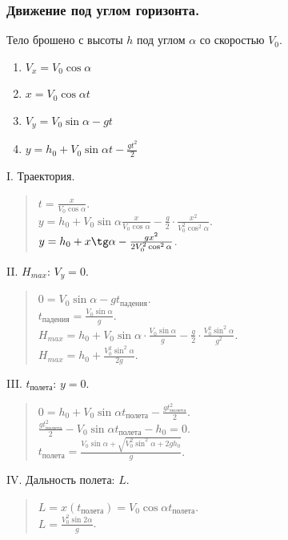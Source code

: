 \documentclass{article}
\begin{document}
	\subsubsection{Движение под углом горизонта.}
	Тело брошено с высоты $h$ под углом $\alpha$ со скоростью $V_0$. \\
	\begin{enumerate}
		\item $V_x = V_0 \cos\alpha$
		\item $x = V_0 \cos\alpha t$
		\item $V_y = V_0 \sin\alpha - gt$
		\item $y = h_0 + V_0 \sin\alpha t - \frac{gt^2}{2}$
	\end{enumerate}
	I. Траектория. \\
	\begin{quote}
		$t = \frac{x}{V_0 \cos\alpha}$. \\
		$y = h_0 + V_0 \sin\alpha \frac{x}{V_0 \cos\alpha} - \frac{g}{2} \cdot \frac{x^2}{V_0^2 \cos^2\alpha}$. \\
		$y = h_0 + x \tg\alpha - \frac{gx^2}{2V_0^2\cos^2\alpha}$. \\
	\end{quote}
	II. $H_{max}$: $V_{y} = 0$. \\
	\begin{quote}
		$0 = V_0 \sin\alpha - gt_{\text{падения}}$. \\
		$t_{\text{падения}} = \frac{V_0 \sin\alpha}{g}$. \\
		$H_{max} = h_0 + V_0 \sin\alpha \cdot \frac{V_0 \sin\alpha}{g} - \frac{g}{2} \cdot \frac{V_0^2 \sin^2\alpha}{g^2}$. \\
		$H_{max} = h_0 + \frac{V_0^2 \sin^2\alpha}{2g}$. \\
	\end{quote}
	III. $t_{\text{полета}}$: $y = 0$. \\
	\begin{quote}
		$0 = h_0 + V_0 \sin\alpha t_{\text{полета}} - \frac{gt_{\text{полета}}^2}{2}$. \\
		$\frac{gt_{\text{полета}}^2}{2} - V_0 \sin\alpha t_{\text{полета}} - h_0 = 0$. \\
		$t_{\text{полета}} = \frac{V_0 \sin\alpha + \sqrt{V_0^2\sin^2\alpha + 2gh_0}}{g}$. \\
	\end{quote}
	IV. Дальность полета: $L$. \\
	\begin{quote}
		$L = x(t_{\text{полета}}) = V_0 \cos\alpha t_{\text{полета}}$. \\
		$L = \frac{V_0^2 \sin2\alpha}{g}$. \\
	\end{quote}
\end{document}
